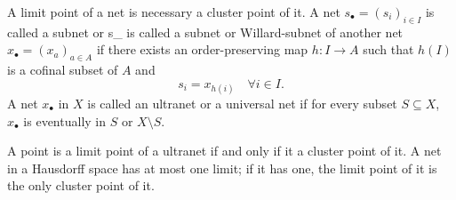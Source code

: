 \documentclass[a4paper,12pt]{article}
\begin{document}
A limit point of a net is necessary a cluster point of it.
A net $s_{\bullet }=\left(s_{i}\right)_{i\in I}$ is called a subnet or 
{\displaystyle s_{\bullet }} is called a subnet or Willard-subnet of another net $x_{\bullet }=\left(x_{a}\right)_{a\in A}$ if there exists an order-preserving map $h\colon I\to A$ such that $h(I)$ is a cofinal subset of $A$ and 
\[s_{i}=x_{h(i)}\quad \forall i\in I.\]
A net $x_{\bullet }$ in $X$ is called an ultranet or a universal net if for every subset $S\subseteq X$, $x_{\bullet }$ is eventually in $S$ or $X\setminus S$.

A point is a limit point of a ultranet if and only if it a cluster point of it.
A net in a Hausdorff space has at most one limit; if it has one, the limit point of it is the only cluster point of it.
\end{document}
